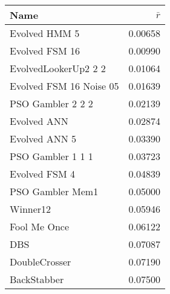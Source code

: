 \begin{tabular}{lr}
\toprule
Name                    &                     $\bar{r}$\\
\midrule
Evolved HMM 5           &                            0.00658 \\
Evolved FSM 16          &                            0.00990 \\
EvolvedLookerUp2 2 2    &                            0.01064 \\
Evolved FSM 16 Noise 05 &                            0.01639 \\
PSO Gambler 2 2 2       &                            0.02139 \\
Evolved ANN             &                            0.02874 \\
Evolved ANN 5           &                            0.03390 \\
PSO Gambler 1 1 1       &                            0.03723 \\
Evolved FSM 4           &                            0.04839 \\
PSO Gambler Mem1        &                            0.05000 \\
Winner12                &                            0.05946 \\
Fool Me Once            &                            0.06122 \\
DBS                     &                            0.07087 \\
DoubleCrosser           &                            0.07190 \\
BackStabber             &                            0.07500 \\
\bottomrule
\end{tabular}
